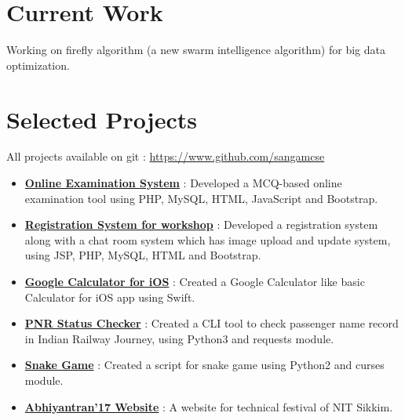 \documentclass[margin, centered]{res}
\begin{document}
\begin{resume}
        \section{Current Work}
            Working on firefly algorithm (a new swarm intelligence algorithm) for big data optimization.

        \section{Selected Projects}
            All projects available on git : \url{https://www.github.com/sangamcse}
            \begin{itemize}[leftmargin=*]
                \item \textbf{\href{https://github.com/sangamcse/online-examination-system}{Online Examination System}} :
                    Developed a MCQ-based online examination tool using PHP, MySQL, HTML, JavaScript and Bootstrap.
                \item \textbf{\href{https://github.com/sangamcse/registration-ESAD}{Registration System for workshop}} :
                    Developed a registration system along with a chat room system which has image upload and update system,
                    using JSP, PHP, MySQL, HTML and Bootstrap.
                \item \textbf{\href{https://github.com/sangamcse/calculator}{Google Calculator for iOS}} : Created a Google
                    Calculator like basic Calculator for iOS app using Swift.
                \item \textbf{\href{https://github.com/sangamcse/myPNRStatus}{PNR Status Checker}} : Created a CLI tool
                    to check passenger name record in Indian Railway Journey, using Python3 and requests module.
                \item \textbf{\href{https://github.com/sangamcse/Snake_game}{Snake Game}} : Created a script for snake game using
                    Python2 and curses module.
                \item \textbf{\href{http://abhiyantran.nitsikkim.ac.in/abhiyantran-17/}{Abhiyantran'17 Website}} : A website for technical festival of NIT Sikkim.
            \end{itemize}
        

\end{resume}
\end{document}

